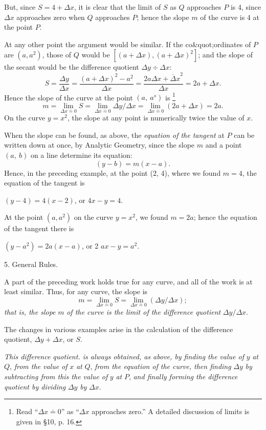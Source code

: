 \documentclass[12pt]{article}
\begin{document}
But, since $S=4+\Delta x$, it is clear that the limit of $S$ as $Q$ 
approaches $P$ is 4, since $\Delta x$ approaches zero when $Q$ approaches
$P$; hence the slope $m$ of the curve is 4 at the point $P$.

At any other point the argument would be similar. If the
co\&quot;{o}rdinates of $P$ are $(a, a^2)$, those of $Q$ would be 
$[(a+\Delta x), (a+\Delta x)^{2}]$; and the slope of the secant would be the difference
quotient $\Delta y \div \Delta x$:
$$
S=\frac{\Delta y}{\Delta x}=\frac{(a+\Delta x)^{2}-a^{2}}{\Delta x}=
\frac{2a\Delta x+{\overline \Delta x}^{2}}{\Delta x}=2a+\Delta x.
$$
Hence the slope of the curve at the point $(a,\ a^{s})$ is 
\footnote{Read ``$\Delta x \doteq 0$'' as ``$\Delta x$ approaches zero.'' 
A detailed discussion of limits is given in \S 10, p. 16.}
$$
m=\lim_{\Delta x \doteq 0}S=\lim_{\Delta x\doteq 0}\Delta y/\Delta x=
\lim_{\Delta x \doteq 0}(2a+\Delta x)=2a.
$$
On the curve $y=x^2$, the slope at any point is numerically twice
the value of $x$.

When the slope can be found, as above, the {\it equation of the
tangent} at $P$ can be written down at once, by Analytic Geometry, 
since the slope $m$ and a point $(a,\ b)$ on a line determine
its equation:
$$
(y-b)=m(x-a).
$$
Hence, in the preceding example, at the point (2, 4), where
we found $m=4$, the equation of the tangent is
\begin{center}
$(y-4)=4(x-2)$, or $4x-y=4$.
\end{center}
At the point $(a, a^{2})$ on the curve $y=x^2$, we found $m=2a$;
hence the equation of the tangent there is
\begin{center}
$(y-a^2)=2a(x-a)$, or 2 $ax- y=a^2$.
\end{center}

5. General Rules.

A part of the preceding work holds true
for any curve, and all of the work is at least similar. Thus,
for any curve, the slope is
$$
m=\lim_{\Delta x \doteq 0}S=\lim_{\Delta x \doteq 0}(\Delta y/\Delta x);
$$
{\it that is, the slope} $m$ {\it of the curve is the limit of the 
difference quotient} $\Delta y/\Delta x$.

The changes in various examples arise in the calculation of
the difference quotient, $\Delta y+\Delta x$, or $S$.

{\it This difference quotient. is always obtained, as above, by finding
the value of} $y$ {\it at} $Q$, {\it from the value of} $x$ {\it at} $Q$, 
{\it from the equation of the curve, then finding} $\Delta y$  
{\it by subtracting from this the value of} $y$ {\it at} $P$, 
{\it and finally forming the difference quotient by dividing} $\Delta y$ 
{\it by} $\Delta x$.
\end{document}
